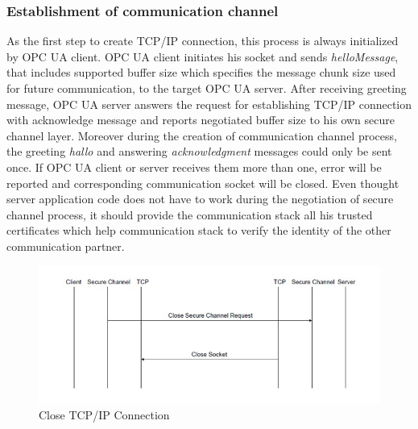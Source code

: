 \documentclass[]{llncs}
\begin{document}
\subsubsection{Establishment of communication channel}
As the first step to create TCP/IP connection, this process is always initialized by OPC UA client. OPC UA client initiates his socket and sends \emph{helloMessage}, that includes supported buffer size which specifies the message chunk size used for future communication, to the target OPC UA server. After receiving greeting message, OPC UA server answers the request for establishing TCP/IP connection with acknowledge message and reports negotiated buffer size to his own secure channel layer. Moreover during the creation of communication channel process, the greeting \emph{hallo} and answering \emph{acknowledgment} messages could only be sent once. If OPC UA client or server receives them more than one, error will be reported and corresponding communication socket will be closed. Even thought server application code does not have to work during the negotiation of secure channel process, it should provide the communication stack all his trusted certificates which help communication stack to verify the identity of the other communication partner. 
\begin{figure}[!htbp]
	\centering
	\includegraphics[width=1\textwidth]{tcp_2.jpg}
		\caption[ ]{Close TCP/IP Connection\cite{O6}}
	\label{fig:tcp_2}
\end{figure}
\end{document}
